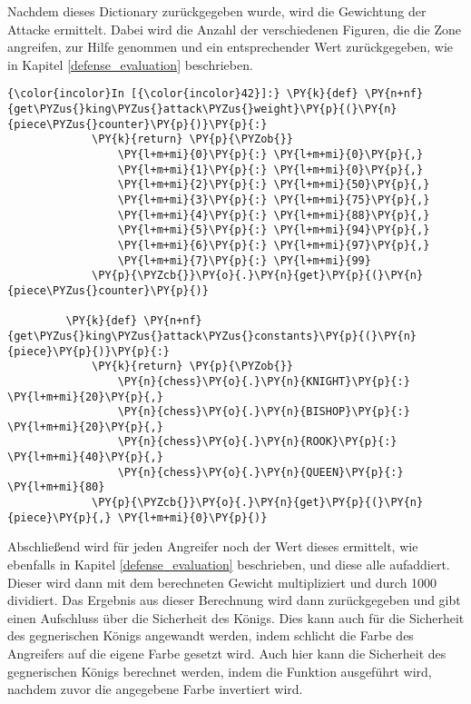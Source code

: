 Nachdem dieses Dictionary zurückgegeben wurde, wird die Gewichtung der
Attacke ermittelt. Dabei wird die Anzahl der verschiedenen Figuren, die
die Zone angreifen, zur Hilfe genommen und ein entsprechender Wert
zurückgegeben, wie in Kapitel \ref{defense_evaluation} beschrieben.

        \begin{Verbatim}[commandchars=\\\{\}]
{\color{incolor}In [{\color{incolor}42}]:} \PY{k}{def} \PY{n+nf}{get\PYZus{}king\PYZus{}attack\PYZus{}weight}\PY{p}{(}\PY{n}{piece\PYZus{}counter}\PY{p}{)}\PY{p}{:}
             \PY{k}{return} \PY{p}{\PYZob{}}
                 \PY{l+m+mi}{0}\PY{p}{:} \PY{l+m+mi}{0}\PY{p}{,}
                 \PY{l+m+mi}{1}\PY{p}{:} \PY{l+m+mi}{0}\PY{p}{,}
                 \PY{l+m+mi}{2}\PY{p}{:} \PY{l+m+mi}{50}\PY{p}{,}
                 \PY{l+m+mi}{3}\PY{p}{:} \PY{l+m+mi}{75}\PY{p}{,}
                 \PY{l+m+mi}{4}\PY{p}{:} \PY{l+m+mi}{88}\PY{p}{,}
                 \PY{l+m+mi}{5}\PY{p}{:} \PY{l+m+mi}{94}\PY{p}{,}
                 \PY{l+m+mi}{6}\PY{p}{:} \PY{l+m+mi}{97}\PY{p}{,}
                 \PY{l+m+mi}{7}\PY{p}{:} \PY{l+m+mi}{99}
             \PY{p}{\PYZcb{}}\PY{o}{.}\PY{n}{get}\PY{p}{(}\PY{n}{piece\PYZus{}counter}\PY{p}{)}
         
         \PY{k}{def} \PY{n+nf}{get\PYZus{}king\PYZus{}attack\PYZus{}constants}\PY{p}{(}\PY{n}{piece}\PY{p}{)}\PY{p}{:}
             \PY{k}{return} \PY{p}{\PYZob{}}
                 \PY{n}{chess}\PY{o}{.}\PY{n}{KNIGHT}\PY{p}{:} \PY{l+m+mi}{20}\PY{p}{,}
                 \PY{n}{chess}\PY{o}{.}\PY{n}{BISHOP}\PY{p}{:} \PY{l+m+mi}{20}\PY{p}{,}
                 \PY{n}{chess}\PY{o}{.}\PY{n}{ROOK}\PY{p}{:} \PY{l+m+mi}{40}\PY{p}{,}
                 \PY{n}{chess}\PY{o}{.}\PY{n}{QUEEN}\PY{p}{:} \PY{l+m+mi}{80}
             \PY{p}{\PYZcb{}}\PY{o}{.}\PY{n}{get}\PY{p}{(}\PY{n}{piece}\PY{p}{,} \PY{l+m+mi}{0}\PY{p}{)}
\end{Verbatim}

    Abschließend wird für jeden Angreifer noch der Wert dieses ermittelt,
wie ebenfalls in Kapitel \ref{defense_evaluation} beschrieben, und diese alle aufaddiert.
Dieser wird dann mit dem berechneten Gewicht multipliziert und
durch 1000 dividiert. Das Ergebnis aus dieser Berechnung wird dann
zurückgegeben und gibt einen Aufschluss über die Sicherheit des Königs.
Dies kann auch für die Sicherheit des gegnerischen Königs angewandt
werden, indem schlicht die Farbe des Angreifers auf die eigene Farbe
gesetzt wird. Auch hier kann die Sicherheit des gegnerischen Königs
berechnet werden, indem die Funktion ausgeführt wird, nachdem zuvor die
angegebene Farbe invertiert wird.

